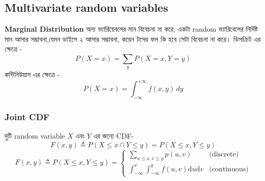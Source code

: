 \documentclass[graybox, envcountchap, twocolumn]{styles/svmult}
\begin{document}


\subsection{Multivariate random variables}

\textbf{Marginal Distribution}
{\bengalifont অন্য ভ্যারিয়েবলের মান বিবেচনা না করে, একটা random ভ্যারিবেলের নির্দিষ্ট মান আসার সম্ভাবনা,যেমন ডাইসে ২ আসার সম্ভাবনা, কয়েন টসের ফল কি হবে সেটা বিবেচনা না করে।
ডিসক্রিট এর ক্ষেত্রে - }
\begin{equation}
    P(X = x) = \sum_y P(X = x, Y = y)
\end{equation} 
{\bengalifont কন্টিনিউয়াস এর ক্ষেত্রে }- 
\begin{equation}
    P(X = x) = \int_{-\infty}^{+\infty} f(x, y) \, dy
\end{equation}

\subsubsection{Joint CDF}
{\bengalifont দুটি random variable $X$ এবং $Y$ এর জন্যে } CDF- 
\[
F(x,y) \triangleq P(X \leq x \cap Y \leq y)=P(X \leq x , Y \leq y)
\]
\begin{equation}
F(x,y) \triangleq P(X \leq x, Y \leq y) = \begin{cases}
\sum_{u \leq x, v \leq y} p(u,v) & \text{(discrete)} \\
\int_{-\infty}^{x} \int_{-\infty}^{y} f(u,v)\mathrm{d}u \mathrm{d}v & \text{(continuous)}
\end{cases}
\end{equation}
\end{document}
